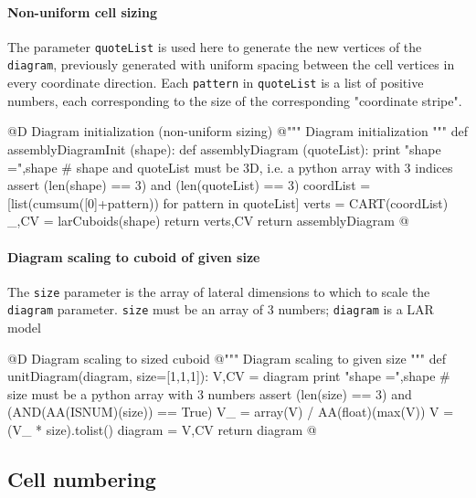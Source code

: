 \documentclass[11pt,oneside]{article}	%
\begin{document}
\paragraph{Non-uniform cell sizing}

The parameter \texttt{quoteList} is used here to generate the new vertices of the \texttt{diagram}, previously generated with uniform spacing between the cell vertices in every coordinate direction.
Each \texttt{pattern} in \texttt{quoteList} is a list of positive numbers, each corresponding to the size of the corresponding "coordinate stripe".

@D Diagram initialization (non-uniform sizing)
@{""" Diagram initialization """
def assemblyDiagramInit (shape):
	def assemblyDiagram (quoteList):
		print "\n shape =",shape
		# shape and quoteList must be 3D, i.e. a python array with 3 indices
		assert (len(shape) == 3) and (len(quoteList) == 3)
		coordList = [list(cumsum([0]+pattern)) for pattern in quoteList]
		verts = CART(coordList)
		_,CV = larCuboids(shape)
		return verts,CV
	return assemblyDiagram
@}


\paragraph{Diagram scaling to cuboid of given size}
The \texttt{size} parameter is the array of lateral dimensions to which to scale the 
\texttt{diagram} parameter. \texttt{size} must be an array of 3 numbers; \texttt{diagram} is
a LAR model

@D Diagram scaling to sized cuboid
@{""" Diagram scaling to given size """
def unitDiagram(diagram, size=[1,1,1]):
	V,CV = diagram
	print "\n shape =",shape
	# size must be a python array with 3 numbers
	assert (len(size) == 3) and (AND(AA(ISNUM)(size)) == True)
	V_ = array(V) / AA(float)(max(V))
	V = (V_ * size).tolist()
	diagram = V,CV
	return diagram
@}



\subsection{Cell numbering}
\end{document}
